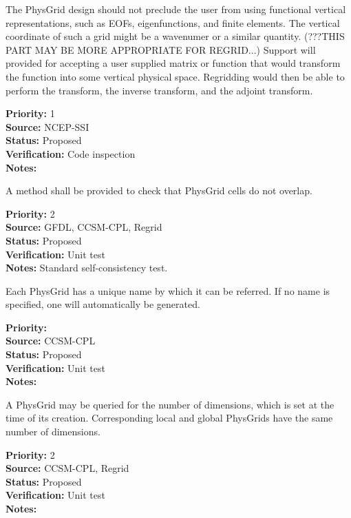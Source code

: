 The PhysGrid design should not preclude the user from using 
functional vertical representations, such as EOFs, eigenfunctions,
and finite elements.  The vertical coordinate of such a grid might be a wavenumer
or a similar quantity.
(???THIS PART MAY BE MORE APPROPRIATE FOR REGRID...) Support will provided for
accepting a user supplied matrix or function that would transform the function into some
vertical physical space. Regridding would then be able to perform the transform, the
inverse transform, and the adjoint transform.
\begin{reqlist}
{\bf Priority:} 1 \\
{\bf Source:} NCEP-SSI \\
{\bf Status:} Proposed \\
{\bf Verification:} Code inspection \\
{\bf Notes:} 
\end{reqlist}

A method shall be provided to check that PhysGrid cells do not overlap. 
\begin{reqlist}
{\bf Priority:} 2 \\
{\bf Source:} GFDL, CCSM-CPL, Regrid \\
{\bf Status:} Proposed \\
{\bf Verification:} Unit test\\
{\bf Notes:} Standard self-consistency test.
\end{reqlist}


Each PhysGrid has a unique name by which it can be referred.  If no name is
specified, one will automatically be generated.
\begin{reqlist}
{\bf Priority:} \\
{\bf Source:} CCSM-CPL \\
{\bf Status:} Proposed \\
{\bf Verification:} Unit test \\
{\bf Notes:} 
\end{reqlist}

A PhysGrid may be queried for the number of dimensions, which is
set at the time of its creation.  Corresponding local and global PhysGrids have
the same number of dimensions.
\begin{reqlist}
{\bf Priority:} 2 \\
{\bf Source:} CCSM-CPL, Regrid \\
{\bf Status:} Proposed \\
{\bf Verification:} Unit test \\
{\bf Notes:} 
\end{reqlist}

